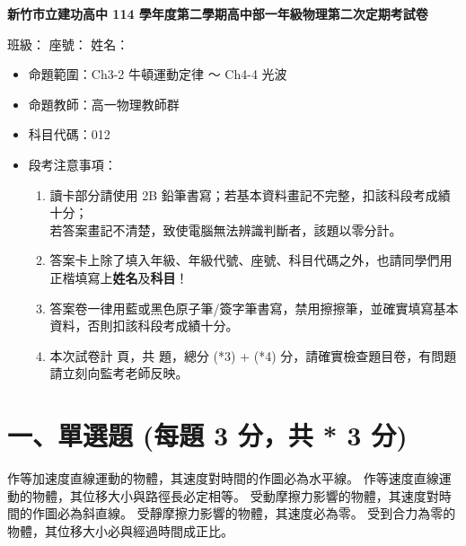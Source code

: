 \documentclass[10pt,a4paper]{article}
\begin{document}
\begin{center}
    \Large \textbf{新竹市立建功高中 114 學年度第二學期高中部一年級物理第二次定期考試卷}
\end{center}

\noindent \hspace*{\fill} \large 班級：\underline{\hspace{1.5cm}} 座號：\underline{\hspace{1cm}} 姓名：\underline{\hspace{2.5cm}}

\vspace{1em}

\begin{itemize}[leftmargin=1em]
    \item[$\ast$] 命題範圍：Ch3-2 牛頓運動定律 ～ Ch4-4 光波
    \item[$\ast$] 命題教師：高一物理教師群
    \item[$\ast$] 科目代碼：012
    \item[$\ast$] 段考注意事項：
    \begin{enumerate}[label=\arabic*., leftmargin=2em]
        \item 讀卡部分請使用 2B 鉛筆書寫；若基本資料畫記不完整，扣該科段考成績十分；\\若答案畫記不清楚，致使電腦無法辨識判斷者，該題以零分計。
        \item 答案卡上除了填入年級、年級代號、座號、科目代碼之外，也請同學們用正楷填寫上\textbf{姓名}及\textbf{科目}！
        \item 答案卷一律用藍或黑色原子筆/簽字筆書寫，禁用擦擦筆，並確實填寫基本資料，否則扣該科段考成績十分。
        \item 本次試卷計 \pageref{LastPage} 頁，共  題，總分 \the\numexpr (*3) + (*4) \relax 分，請確實檢查題目卷，有問題請立刻向監考老師反映。
    \end{enumerate}
\end{itemize}

\section*{一、單選題 (每題 3 分，共 \the\numexpr {} * 3 \relax 分)}
{作等加速度直線運動的物體，其速度對時間的作圖必為水平線。}
{作等速度直線運動的物體，其位移大小與路徑長必定相等。}
{受動摩擦力影響的物體，其速度對時間的作圖必為斜直線。}
{受靜摩擦力影響的物體，其速度必為零。}
{受到合力為零的物體，其位移大小必與經過時間成正比。}
\end{document}
